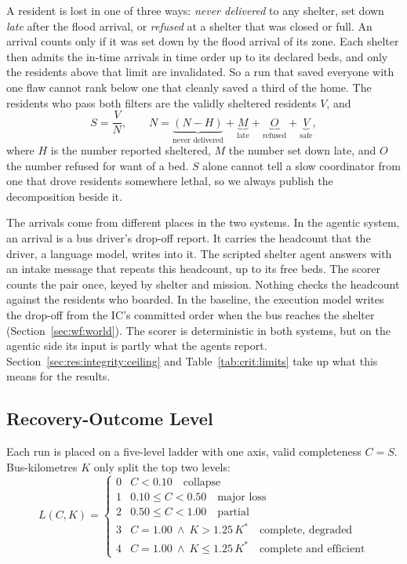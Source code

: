 A resident is lost in one of three ways: \emph{never delivered} to any
shelter, set down \emph{late} after the flood arrival, or \emph{refused} at a
shelter that was closed or full. An arrival counts only if it was set down by
the flood arrival of its zone. Each shelter then admits the in-time arrivals in
time order up to its declared beds, and only the residents above that limit are
invalidated. So a run that saved everyone with one flaw cannot rank below one
that cleanly saved a third of the home. The residents who pass both filters are
the validly sheltered residents $V$, and
\begin{equation}
S = \frac{V}{N}, \qquad
N = \underbrace{(N - H)}_{\text{never delivered}} + \underbrace{M}_{\text{late}} + \underbrace{O}_{\text{refused}} + \underbrace{V}_{\text{safe}},
\label{eq:eval:survival}
\end{equation}
where $H$ is the number reported sheltered, $M$ the number set down late, and
$O$ the number refused for want of a bed. $S$ alone cannot tell a slow
coordinator from one that drove residents somewhere lethal, so we always
publish the decomposition beside it.

The arrivals come from different places in the two systems. In the agentic
system, an arrival is a bus driver's drop-off report. It carries the headcount
that the driver, a language model, writes into it. The scripted shelter agent
answers with an intake message that repeats this headcount, up to its free
beds. The scorer counts the pair once, keyed by shelter and mission. Nothing
checks the headcount against the residents who boarded. In the baseline, the
execution model writes the drop-off from the IC's committed order when the bus
reaches the shelter (Section~\ref{sec:wf:world}). The scorer is deterministic
in both systems, but on the agentic side its input is partly what the agents
report. Section~\ref{sec:res:integrity:ceiling} and
Table~\ref{tab:crit:limits} take up what this means for the results.

\subsection{Recovery-Outcome Level}
\label{sec:eval:rubric}

Each run is placed on a five-level ladder with one axis, valid completeness
$C = S$. Bus-kilometres $K$ only split the top two levels:
\begin{equation}
L(C, K) =
\begin{cases}
0 & C < 0.10 \quad \text{collapse}\\
1 & 0.10 \leq C < 0.50 \quad \text{major loss}\\
2 & 0.50 \leq C < 1.00 \quad \text{partial}\\
3 & C = 1.00 \ \wedge\ K > 1.25\,K^\ast \quad \text{complete, degraded}\\
4 & C = 1.00 \ \wedge\ K \leq 1.25\,K^\ast \quad \text{complete and efficient}
\end{cases}
\label{eq:eval:ladder}
\end{equation}

